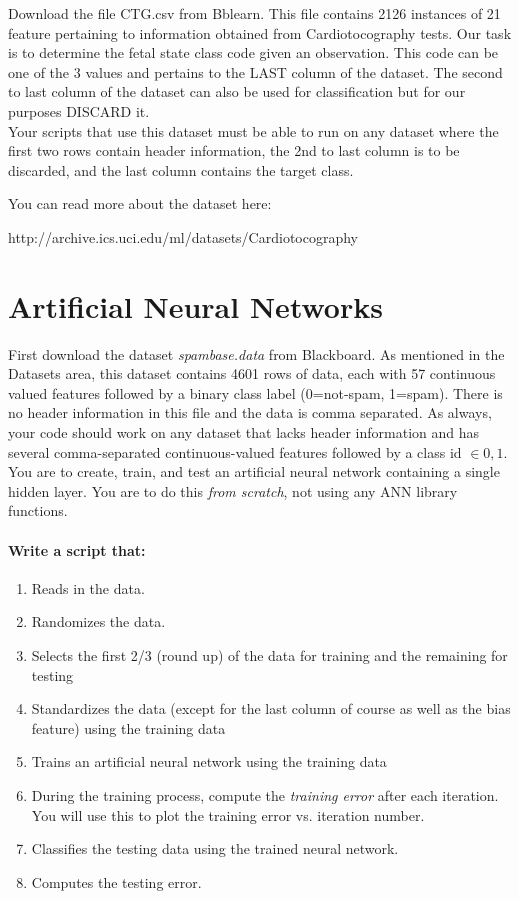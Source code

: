 \documentclass[12pt]{article}
\begin{document}
Download the file CTG.csv from Bblearn. This file contains 2126 instances of 21 feature pertaining to information obtained from Cardiotocography tests. Our task is to determine the fetal state class code given an observation. This code can be one of the 3 values and pertains to the LAST column of the dataset. The second to last column of the dataset can also be used for classification but for our purposes DISCARD it.\\

\noindent
Your scripts that use this dataset must be able to run on any dataset where the first two rows contain header information, the 2nd to last column is to be discarded, and the last column contains the target class.

\noindent
You can read more about the dataset here:
\begin{center}
http://archive.ics.uci.edu/ml/datasets/Cardiotocography
\end{center}

\newpage
\section{Artificial Neural Networks}
First download the dataset \emph{spambase.data} from Blackboard.  As mentioned in the Datasets area, this dataset contains 4601 rows of data, each with 57 continuous valued features followed by a binary class label (0=not-spam, 1=spam).  There is no header information in this file and the data is comma separated.  As always, your code should work on any dataset that lacks header information and has several comma-separated continuous-valued features followed by a class id $\in {0,1}$.\\

\noindent
You are to create, train, and test an artificial neural network containing a single hidden layer.  You are to do this \emph{from scratch}, not using any ANN library functions.

\noindent
\paragraph{Write a script that:}
\begin{enumerate}
  \item Reads in the data.
  \item Randomizes the data.
  \item Selects the first 2/3 (round up) of the data for training and the remaining for testing
  \item Standardizes the data (except for the last column of course as well as the bias feature) using the training data
  \item Trains an artificial neural network using the training data
  \item During the training process, compute the \emph{training error} after each iteration.  You will use this to plot the training error vs. iteration number.
  \item Classifies the testing data using the trained neural network.
  \item Computes the testing error.
\end{enumerate}
\end{document}
